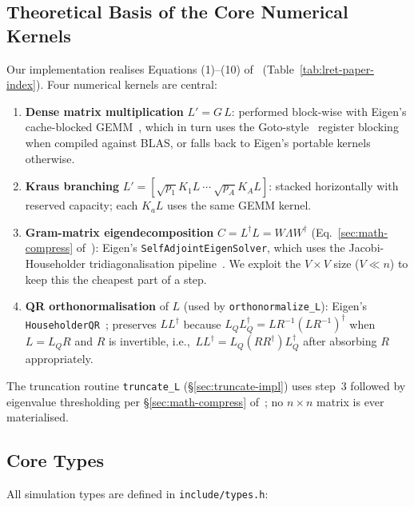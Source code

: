 \documentclass[11pt,a4paper]{article}
\begin{document}
\subsection{Theoretical Basis of the Core Numerical Kernels}

Our implementation realises Equations (1)--(10) of~\cite{chen2021lret}
(Table~\ref{tab:lret-paper-index}). Four numerical kernels are central:

\begin{enumerate}
  \item \textbf{Dense matrix multiplication} $L' = G\,L$: performed block-wise with
        Eigen's cache-blocked GEMM~\cite{eigen2010}, which in turn uses the
        Goto-style~\cite{goto2008anatomy} register blocking when compiled against
        BLAS, or falls back to Eigen's portable kernels otherwise.
  \item \textbf{Kraus branching} $L' = [\sqrt{p_1}K_1 L\ \cdots\ \sqrt{p_A}K_A L]$:
        stacked horizontally with reserved capacity; each $K_a L$ uses the same GEMM
        kernel.
  \item \textbf{Gram-matrix eigendecomposition} $C = L^\dagger L = W\Lambda W^\dagger$
        (Eq.~\eqref{sec:math-compress} of~\cite{chen2021lret}): Eigen's
        \texttt{SelfAdjointEigenSolver}, which uses the Jacobi-Householder
        tridiagonalisation pipeline~\cite{goluvanloan2013}. We exploit the
        $V \times V$ size ($V \ll n$) to keep this the cheapest part of a step.
  \item \textbf{QR orthonormalisation} of $L$ (used by \texttt{orthonormalize\_L}):
        Eigen's \texttt{HouseholderQR}~\cite{goluvanloan2013}; preserves
        $LL^\dagger$ because $L_Q L_Q^\dagger = LR^{-1}(LR^{-1})^\dagger$ when $L = L_Q R$
        and $R$ is invertible, i.e.,\ $LL^\dagger = L_Q (R R^\dagger) L_Q^\dagger$ after
        absorbing $R$ appropriately.
\end{enumerate}

The truncation routine \texttt{truncate\_L} (\S\ref{sec:truncate-impl}) uses step~3
followed by eigenvalue thresholding per \S\ref{sec:math-compress} of~\cite{chen2021lret};
no $n \times n$ matrix is ever materialised.

\subsection{Core Types}

All simulation types are defined in \texttt{include/types.h}:
\end{document}
